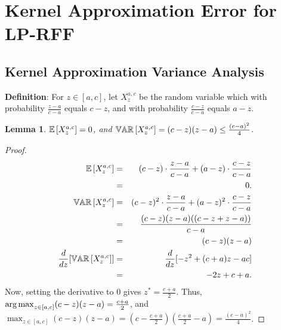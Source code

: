 \documentclass[12pt]{article}
\newtheorem{lemma}[theorem]{Lemma}
\begin{document}
\section{Kernel Approximation Error for LP-RFF}
\label{sec:kernel_approx}

\subsection{Kernel Approximation Variance Analysis}
\noindent\textbf{Definition}:  For $z \in [a,c]$, let $X_z^{a,c}$ be the random variable which with probability $\frac{z-a}{c-a}$ equals $c-z$, and with probability $\frac{c-z}{c-a}$ equals $a-z$.

\begin{lemma}
\label{lemma:qvar}
$\expect{}{X_z^{a,c}} = 0$, and $\var{}{X_z^{a,c}} = (c-z)(z-a) \leq \frac{(c-a)^2}{4}$.
\end{lemma}

\begin{proof}
\begin{eqnarray*}
	\expect{}{X_z^{a,c}} &=&  (c-z)\cdot \frac{z-a}{c-a} + (a-z)\cdot \frac{c-z}{c-a}\\
	&=& 0 .\\
	\var{}{X_z^{a,c}} &=& (c-z)^2\cdot \frac{z-a}{c-a} + (a-z)^2\cdot \frac{c-z}{c-a}\\
	&=& \frac{(c-z)(z-a)((c-z + z-a))}{c-a} \\
	&=& (c-z)(z-a)\\
	\frac{d}{dz}[\var{}{X_z^{a,c}}] &=& \frac{d}{dz}[-z^2 + (c+a)z -ac] \\
	&=& -2z + c+a.
\end{eqnarray*}
Now, setting the derivative to 0 gives $z^* = \frac{c+a}{2}$.  Thus, $\operatorname*{arg\,max}_{z\in[a,c]} (c-z)(z-a) = \frac{c+a}{2}$, and $\max_{z\in[a,c]} (c-z)(z-a) = (c-\frac{c+a}{2})(\frac{c+a}{2}-a) = \frac{(c-a)^2}{4}$.
\end{proof}
\end{document}
